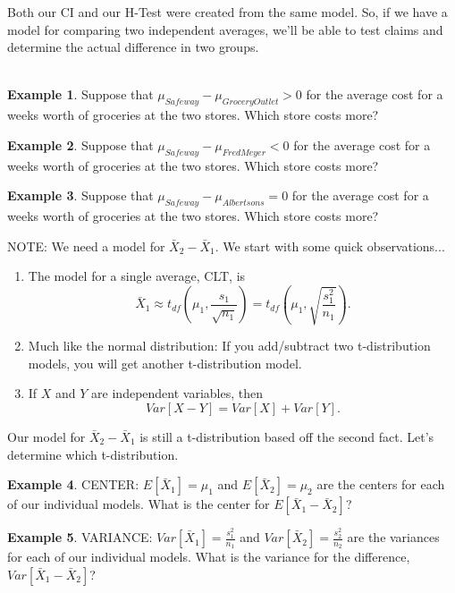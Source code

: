 \documentclass[12pt]{amsart}
\theoremstyle{definition}
\newtheorem{ex}{Example}
\begin{document}
Both our CI and our H-Test were created from the same model. So, if we have a model for comparing two independent averages, we'll be able to test claims and determine the actual difference in two groups.\\
~\\
\begin{ex} Suppose that $\mu_{Safeway}-\mu_{Grocery Outlet}>0$ for the average cost for a weeks worth of groceries at the two stores. Which store costs more?\end{ex} \vfill

\begin{ex} Suppose that $\mu_{Safeway}-\mu_{Fred Meyer}<0$ for the average cost for a weeks worth of groceries at the two stores. Which store costs more?\end{ex} \vfill

\begin{ex} Suppose that $\mu_{Safeway}-\mu_{Albertsons}=0$ for the average cost for a weeks worth of groceries at the two stores. Which store costs more?\end{ex} \vfill

NOTE:
\newpage
We need a model for $\bar{X}_2-\bar{X}_1$. We start with some quick observations...
\begin{enumerate}
 \item The model for a single average, CLT, is $$\bar{X}_1\approx t_{df}\left(\mu_1, \frac{s_1}{\sqrt{n_1}}\right)=t_{df}\left(\mu_1, \sqrt{\frac{s_1^2}{n_1}}\right).$$
 \item Much like the normal distribution: If you add/subtract two t-distribution models, you will get another t-distribution model.
 \item If $X$ and $Y$ are independent variables, then $$Var[X-Y]=Var[X]+Var[Y].$$
\end{enumerate}

Our model for $\bar{X}_2-\bar{X}_1$ is still a t-distribution based off the second fact. Let's determine which t-distribution.

\begin{ex} CENTER: $E[\bar{X}_1]=\mu_1$ and $E[\bar{X}_2]=\mu_2$ are the centers for each of our individual models. What is the center for $E[\bar{X}_1-\bar{X}_2]$?
\end{ex}

\vspace{1in}

\begin{ex} VARIANCE: $Var[\bar{X}_1]=\frac{s_1^2}{n_1}$ and $Var[\bar{X}_2]=\frac{s_2^2}{n_2}$ are the variances for each of our individual models. What is the variance for the difference, $Var[\bar{X}_1-\bar{X}_2]$?
\end{ex}
\end{document}
